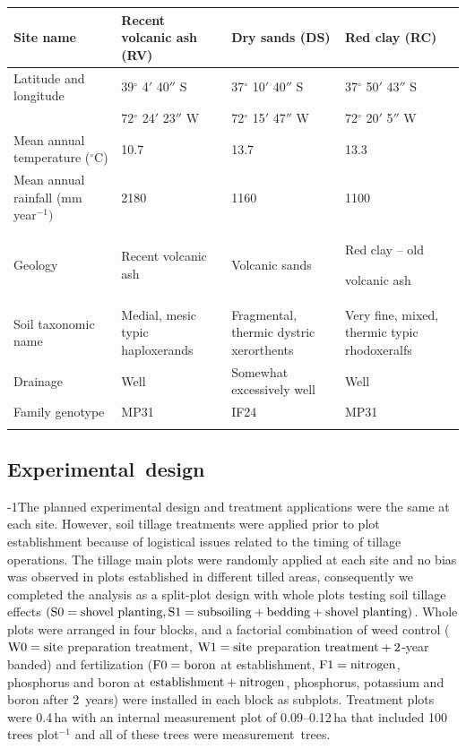 \documentclass[final]{foresj}
\begin{document}
\begin{table}[!t]
{\begin{tabular*}{\textwidth}{@{\extracolsep{\fill}}lP{10pc}P{10pc}P{10pc}@{}} \toprule Site name& Recent
volcanic ash (RV)& Dry sands (DS)&
Red clay (RC) \\
\midrule
Latitude and longitude& 39$^{\circ}$ 4$'$ 40$''$ S
& 37$^{\circ}$ 10$'$ 40$''$ S &
37$^{\circ}$ 50$' $ 43$''$ S  \\
&72$^{\circ}$ 24$'$ 23$''$ W&72$^{\circ}$ 15$' $ 47$''$ W&72$^{\circ}$ 20$' $ 5$''$ W\\
Mean annual temperature ($^{\circ}$C)& 10.7& 13.7&13.3 \\
Mean annual rainfall (mm year$^{-1})$& 2180& 1160&
1100 \\
Geology& Recent volcanic ash& Volcanic sands&
Red clay -- old\par volcanic ash \\
Soil taxonomic name& Medial, mesic typic haploxerands&
Fragmental, thermic dystric xerorthents&
Very fine, mixed, thermic typic rhodoxeralfs \\
Drainage& Well& Somewhat excessively well&
Well \\
Family genotype& MP31& IF24&
MP31 \\
\botrule
\end{tabular*}}{}
\vskip1.5pc
\end{table}

\subsection{Experimental~design}

\looseness-1The planned experimental design and treatment applications
were the same at each site. However, soil tillage
treatments were applied prior to plot establishment because
of logistical issues related to the timing of tillage
operations. The tillage main plots were randomly applied at
each site and no bias was observed in plots established in
different tilled areas, consequently we completed the
analysis as a split-plot design with whole plots testing
soil tillage effects $(\hbox{S}0=\hbox{shovel planting},
\hbox{S}1=\hbox{subsoiling} + \hbox{bedding} + \hbox{shovel
planting})$. Whole plots were arranged in four blocks, and
a factorial combination of weed \nobreak control
($\hbox{W}0=\hbox{site}$ preparation treatment,
$\hbox{W}1=\hbox{site}$ preparation \hbox{$\hbox{treatment} +
2$-year} banded) and fertilization ($\hbox{F}0=\hbox{boron}$
at establishment, $\hbox{F}1= \hbox{nitrogen}$, phosphorus
and boron at $\hbox{establishment} + \hbox{nitrogen}$,
phosphorus, potassium and boron after 2~years) were
installed in each block as subplots. Treatment plots were
0.4\,ha with an internal measurement plot of 0.09--0.12\,ha
that included 100 trees plot$^{-1}$ and all of these trees
were measurement~trees.
\end{document}
